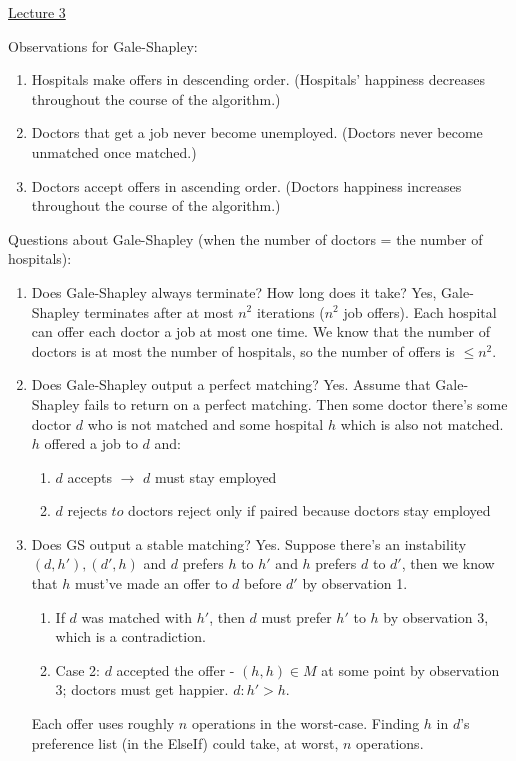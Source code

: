 \documentclass[12pt]{article}
\begin{document}
\underline{Lecture 3}

Observations for Gale-Shapley:

\begin{enumerate}
    \item Hospitals make offers in descending order. (Hospitals' happiness decreases throughout the course of the algorithm.)
    \item Doctors that get a job never become unemployed. (Doctors never become unmatched once matched.)
    \item Doctors accept offers in ascending order. (Doctors happiness increases throughout the course of the algorithm.)
\end{enumerate}

Questions about Gale-Shapley (when the number of doctors = the number of hospitals): \begin{enumerate}
    \item Does Gale-Shapley always terminate? How long does it take?
          Yes, Gale-Shapley terminates after at most $n^2$ iterations ($n^2$ job offers). Each hospital can offer each doctor a job at most one time. We know that the number of doctors is at most the number of hospitals, so the number of offers is $\leq n^2$.
    \item Does Gale-Shapley output a perfect matching?
          Yes. Assume that Gale-Shapley fails to return on a perfect matching. Then some doctor there's some doctor $d$ who is not matched and some hospital $h$ which is also not matched.
          $h$ offered a job to $d$ and: \begin{enumerate}
              \item $d$ accepts $\to$ $d$ must stay employed
              \item $d$ rejects $to$ doctors reject only if paired because doctors stay employed
          \end{enumerate}
    \item Does GS output a stable matching?
          Yes. Suppose there's an instability $(d, h'), (d', h)$ and $d$ prefers $h$ to $h'$ and $h$ prefers $d$ to $d'$, then we know that $h$ must've made an offer to $d$ before $d'$ by observation 1. \begin{enumerate}
            \item If $d$ was matched with $h'$, then $d$ must prefer $h'$ to $h$ by observation 3, which is a contradiction.  
            \item Case 2: $d$ accepted the offer - $(h, h) \in M$ at some point by observation 3; doctors must get happier. $d: h' > h$.
          \end{enumerate}
          
          
          Each offer uses roughly $n$ operations in the worst-case.
          Finding $h$ in $d$'s preference list (in the ElseIf) could take, at worst, $n$ operations. 
\end{enumerate}
\end{document}
